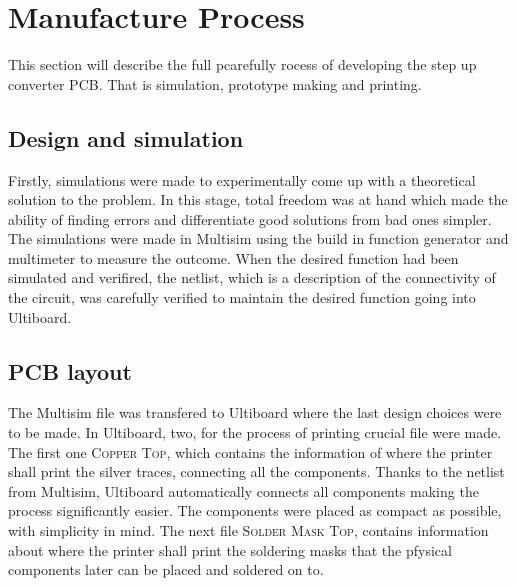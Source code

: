 \section{Manufacture Process}
This section will describe the full pcarefully rocess of developing the step up converter PCB\@. That is simulation, prototype making and printing.\
\subsection{Design and simulation}
Firstly, simulations were made to experimentally come up with a theoretical solution to the problem. In this stage, total freedom was at hand which made the ability of finding errors and differentiate good solutions from bad ones simpler. The simulations were made in Multisim using the build in function generator and multimeter to measure the outcome. When the desired function had been simulated and verifired, the netlist, which is a description of the connectivity of the circuit, was carefully verified to maintain the desired function going into Ultiboard.
\subsection{PCB layout}
The Multisim file was transfered to Ultiboard where the last design choices were to be made. In Ultiboard, two, for the process of printing crucial file were made. The first one \textsc{Copper Top}, which contains the information of where the printer shall print the silver traces, connecting all the components. Thanks to the netlist from Multisim, Ultiboard automatically connects all components making the process significantly easier. The components were placed as compact as possible, with simplicity in mind. The next file \textsc{Solder Mask Top}, contains information about where the printer shall print the soldering masks that the pfysical components later can be placed and soldered on to.

